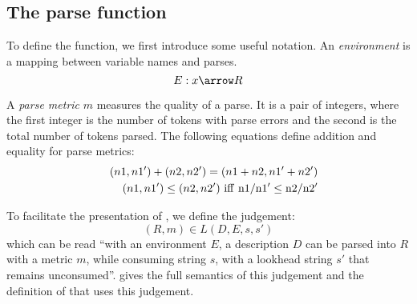 \subsection{The parse function}
\label{sec:parse}
To define the  function, we first introduce some useful notation.
An {\em environment} is a mapping between variable names and parses.
\[E : x \arrow R \]

A {\em parse metric} $m$ measures the quality of a parse. It is a 
pair of integers, where the first integer is the number of tokens
with parse errors and the second is the total number of tokens parsed.
The following equations define addition and equality for parse metrics:
\begin{eqnarray*}
&&(n1, n1') + (n2, n2') = (n1 + n2, n1' + n2')  \\ 
&&(n1,n1') \le (n2,n2')~\rm{iff}~ n1/n1' \le n2/n2' 
\end{eqnarray*}

To facilitate the presentation of , we define the judgement:
\[(R, m) \in L(D, E, s, s')\]
which can be read ``with an environment $E$, a description $D$
can be parsed into $R$ with a metric $m$, while consuming
string $s$, with a lookhead string $s'$ that remains unconsumed''.
 gives the full semantics of this judgement and
the definition of  that uses this judgement.

